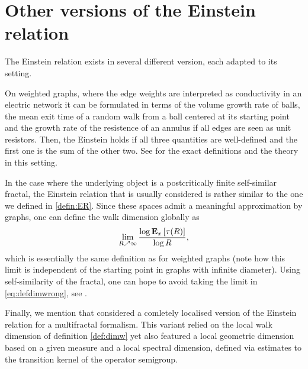 \section{Other versions of the Einstein relation}

The Einstein relation exists in several different version, each adapted to its setting. 

On weighted graphs, where the edge weights are interpreted as conductivity in an electric network it can be formulated in terms of the
volume growth rate of balls, the mean exit time of a random walk from a ball centered at its starting point and the growth rate of the resistence of an annulus if all edges are seen as unit resistors. Then, the Einstein holds if all three quantities are well-defined and the first one is the sum of the other two. See \cite{telcs2006art} for the exact definitions and the theory in this setting. 

In the case where the underlying object is a postcritically finite self-similar fractal, the Einstein relation that is usually considered is rather similar to the one we defined in \ref{defin:ER}. Since these spaces admit a meaningful approximation by graphs, one can define the walk dimension globally as 
\begin{equation}\label{eq:defdimwrong}
  \lim_{R\nearrow\infty}\frac{\log \PTEp{\tau(R)}{x}}{\log R},
\end{equation}
which is essentially the same definition as for weighted graphs (note how this limit is independent of the starting point in graphs with infinite diameter). Using self-similarity of the fractal, one can hope to avoid taking the limit in \eqref{eq:defdimwrong}, see \cite{freiberg2012einstein}. 

Finally, we mention that \cite{hambly_kigami_kumagai_2002} considered a comletely localised version of the Einstein relation for a multifractal formalism. This variant relied on the local walk dimension of definition \ref{def:dimw} yet also featured a local geometric dimension based on a given measure and a local spectral dimension, defined via estimates to the transition kernel of the operator semigroup. 


